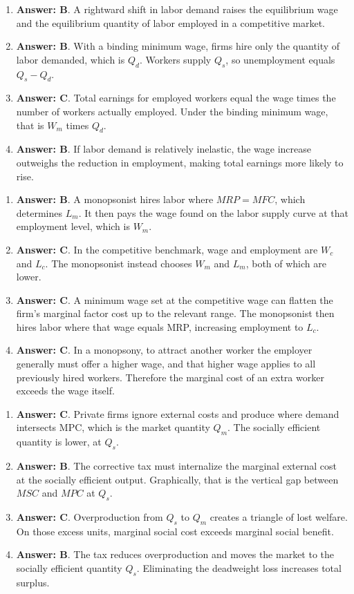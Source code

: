 \documentclass[10pt]{article}
\begin{document}
\begin{enumerate}[resume*=curves, leftmargin=*, itemsep=0.58em, topsep=0.18em, parsep=0pt]
\item \textbf{Answer: B}. A rightward shift in labor demand raises the equilibrium wage and the equilibrium quantity of labor employed in a competitive market.
\item \textbf{Answer: B}. With a binding minimum wage, firms hire only the quantity of labor demanded, which is $Q_d$. Workers supply $Q_s$, so unemployment equals $Q_s-Q_d$.
\item \textbf{Answer: C}. Total earnings for employed workers equal the wage times the number of workers actually employed. Under the binding minimum wage, that is $W_m$ times $Q_d$.
\item \textbf{Answer: B}. If labor demand is relatively inelastic, the wage increase outweighs the reduction in employment, making total earnings more likely to rise.
\end{enumerate}
\begin{enumerate}[resume*=curves, leftmargin=*, itemsep=0.58em, topsep=0.18em, parsep=0pt]
\item \textbf{Answer: B}. A monopsonist hires labor where $MRP=MFC$, which determines $L_m$. It then pays the wage found on the labor supply curve at that employment level, which is $W_m$.
\item \textbf{Answer: C}. In the competitive benchmark, wage and employment are $W_c$ and $L_c$. The monopsonist instead chooses $W_m$ and $L_m$, both of which are lower.
\item \textbf{Answer: C}. A minimum wage set at the competitive wage can flatten the firm's marginal factor cost up to the relevant range. The monopsonist then hires labor where that wage equals MRP, increasing employment to $L_c$.
\item \textbf{Answer: C}. In a monopsony, to attract another worker the employer generally must offer a higher wage, and that higher wage applies to all previously hired workers. Therefore the marginal cost of an extra worker exceeds the wage itself.
\end{enumerate}
\begin{enumerate}[resume*=curves, leftmargin=*, itemsep=0.58em, topsep=0.18em, parsep=0pt]
\item \textbf{Answer: C}. Private firms ignore external costs and produce where demand intersects MPC, which is the market quantity $Q_m$. The socially efficient quantity is lower, at $Q_s$.
\item \textbf{Answer: B}. The corrective tax must internalize the marginal external cost at the socially efficient output. Graphically, that is the vertical gap between $MSC$ and $MPC$ at $Q_s$.
\item \textbf{Answer: C}. Overproduction from $Q_s$ to $Q_m$ creates a triangle of lost welfare. On those excess units, marginal social cost exceeds marginal social benefit.
\item \textbf{Answer: B}. The tax reduces overproduction and moves the market to the socially efficient quantity $Q_s$. Eliminating the deadweight loss increases total surplus.
\end{enumerate}
\end{document}
